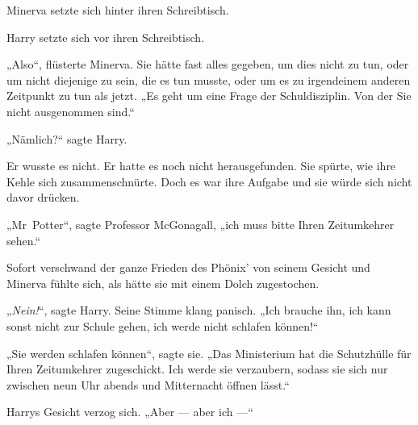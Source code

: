 Minerva setzte sich hinter ihren Schreibtisch.

Harry setzte sich vor ihren Schreibtisch.

„Also“, flüsterte Minerva. Sie hätte fast alles gegeben, um dies nicht zu tun, oder um nicht diejenige zu sein, die es tun musste, oder um es zu irgendeinem anderen Zeitpunkt zu tun als jetzt.
„Es geht um eine Frage der Schuldisziplin. Von der Sie nicht ausgenommen sind.“

„Nämlich?“ sagte Harry.

Er wusste es nicht. Er hatte es noch nicht herausgefunden. Sie spürte, wie ihre Kehle sich zusammenschnürte. Doch es war ihre Aufgabe und sie würde sich nicht davor drücken.

„Mr~Potter“, sagte Professor McGonagall, „ich muss bitte Ihren Zeitumkehrer sehen.“

Sofort verschwand der ganze Frieden des Phönix’ von seinem Gesicht und Minerva fühlte sich, als hätte sie mit einem Dolch zugestochen.

„\emph{Nein!}“, sagte Harry. Seine Stimme klang panisch.
„Ich brauche ihn, ich kann sonst nicht zur Schule gehen, ich werde nicht schlafen können!“

„Sie werden schlafen können“, sagte sie.
„Das Ministerium hat die Schutzhülle für Ihren Zeitumkehrer zugeschickt. Ich werde sie verzaubern, sodass sie sich nur zwischen neun Uhr abends und Mitternacht öffnen lässt.“

Harrys Gesicht verzog sich.
„Aber — aber ich —“

